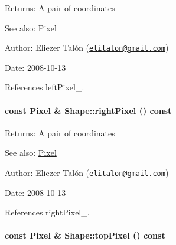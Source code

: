 \begin{Desc}
\item[Returns:]A pair of coordinates\end{Desc}
\begin{Desc}
\item[See also:]\hyperlink{_pixel_8hpp_535e59456e3e633842529cfa8ea103c4}{Pixel}\end{Desc}
\begin{Desc}
\item[Author:]Eliezer Talón (\href{mailto:elitalon@gmail.com}{\tt elitalon@gmail.com}) \end{Desc}
\begin{Desc}
\item[Date:]2008-10-13 \end{Desc}


References leftPixel\_\-.\hypertarget{class_shape_c265e43fa90ee2ab7c9cd3a3d1e96d82}{
\paragraph[rightPixel]{\setlength{\rightskip}{0pt plus 5cm}const {\bf Pixel} \& Shape::rightPixel () const}\hfill}
\label{class_shape_c265e43fa90ee2ab7c9cd3a3d1e96d82}


\begin{Desc}
\item[Returns:]A pair of coordinates\end{Desc}
\begin{Desc}
\item[See also:]\hyperlink{_pixel_8hpp_535e59456e3e633842529cfa8ea103c4}{Pixel}\end{Desc}
\begin{Desc}
\item[Author:]Eliezer Talón (\href{mailto:elitalon@gmail.com}{\tt elitalon@gmail.com}) \end{Desc}
\begin{Desc}
\item[Date:]2008-10-13 \end{Desc}


References rightPixel\_\-.\hypertarget{class_shape_063c4934d8c1cd4b02e4e3e4a604f62e}{
\paragraph[topPixel]{\setlength{\rightskip}{0pt plus 5cm}const {\bf Pixel} \& Shape::topPixel () const}\hfill}
\label{class_shape_063c4934d8c1cd4b02e4e3e4a604f62e}


